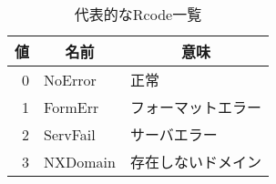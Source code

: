 \begin{table}[htbp]
 \caption{代表的なRcode一覧}
 \centering
  \begin{tabular}{rll}
    \toprule
		\multicolumn{1}{c}{\textbf{値}} & \multicolumn{1}{c}{\textbf{名前}} & \multicolumn{1}{c}{\textbf{意味}}\\
    \midrule
    0 & NoError & 正常\\
    1 & FormErr & フォーマットエラー\\
    2 & ServFail & サーバエラー\\
    3 & NXDomain & 存在しないドメイン\\
    \bottomrule
  \end{tabular}
 \label{tab:dns-rcode}
\end{table}

